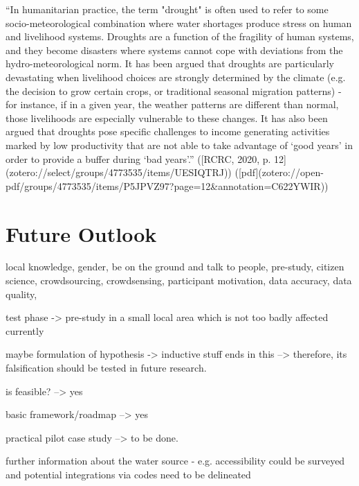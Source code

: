 “In humanitarian practice, the term "drought" is often used to refer to some socio-meteorological combination where water shortages produce stress on human and livelihood systems. Droughts are a function of the fragility of human systems, and they become disasters where systems cannot cope with deviations from the hydro-meteorological norm. It has been argued that droughts are particularly devastating when livelihood choices are strongly determined by the climate (e.g. the decision to grow certain crops, or traditional seasonal migration patterns) - for instance, if in a given year, the weather patterns are different than normal, those livelihoods are especially vulnerable to these changes. It has also been argued that droughts pose specific challenges to income generating activities marked by low productivity that are not able to take advantage of ‘good years’ in order to provide a buffer during ‘bad years’.” ([RCRC, 2020, p. 12](zotero://select/groups/4773535/items/UESIQTRJ)) ([pdf](zotero://open-pdf/groups/4773535/items/P5JPVZ97?page=12&annotation=C622YWIR))


\section{Future Outlook}

local knowledge, gender, be on the ground and talk to people, pre-study, citizen science, crowdsourcing, crowdsensing, participant motivation, data accuracy, data quality,

test phase -> pre-study in a small local area which is not too badly affected currently 


maybe formulation of hypothesis -> inductive stuff ends in this --> therefore, its falsification should be tested in future research.


is feasible? --> yes

basic framework/roadmap --> yes

practical pilot case study --> to be done.


further information about the water source - e.g. accessibility could be surveyed and potential integrations via codes need to be delineated